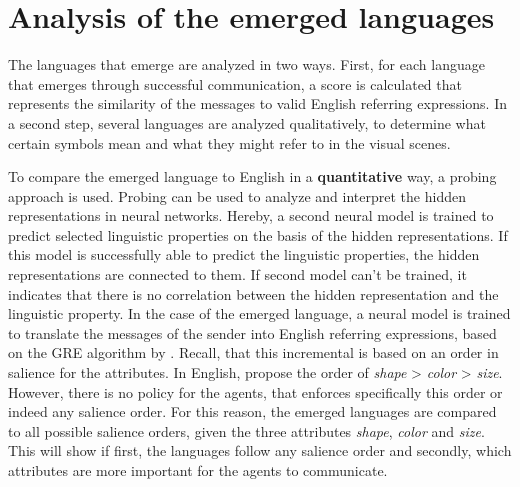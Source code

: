 \section{Analysis of the emerged languages}
\label{sec:analysis_language}
The languages that emerge are analyzed in two ways.
First, for each language that emerges through successful communication, a score is calculated that represents the similarity of the messages to valid English referring expressions.
In a second step, several languages are analyzed qualitatively, to determine what certain symbols mean and what they might refer to in the visual scenes.

To compare the emerged language to English in a \textbf{quantitative} way, a probing approach is used.
Probing can be used to analyze and interpret the hidden representations in neural networks.
Hereby, a second neural model is trained to predict selected linguistic properties on the basis of the hidden representations.
If this model is successfully able to predict the linguistic properties, the hidden representations are connected to them.
If second model can't be trained, it indicates that there is no correlation between the hidden representation and the linguistic property.
In the case of the emerged language, a neural model is trained to translate the messages of the sender into English referring expressions, based on the GRE algorithm by \citet{Dale1995}.
Recall, that this incremental is based on an order in salience for the attributes.
In English, \citet{Dale1995} propose the order of \emph{shape} > \emph{color} > \emph{size}.
However, there is no policy for the agents, that enforces specifically this order or indeed any salience order.
For this reason, the emerged languages are compared to all possible salience orders, given the three attributes \emph{shape}, \emph{color} and \emph{size}.
This will show if first, the languages follow any salience order and secondly, which attributes are more important for the agents to communicate.

